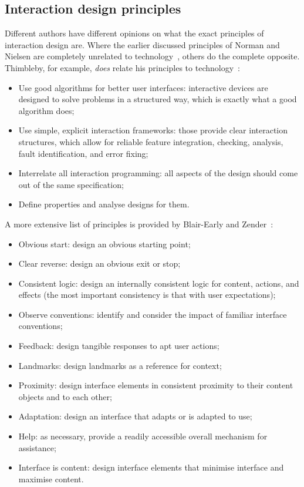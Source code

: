\subsection{Interaction design principles}
Different authors have different opinions on what the exact principles of interaction design are. Where the earlier discussed principles of Norman and Nielsen are completely unrelated to technology~\cite{norman2010gestural}, others do the complete opposite. Thimbleby, for example, \emph{does} relate his principles to technology~\cite{thimbleby2007press}:
\begin{itemize}[noitemsep,topsep=0pt,parsep=0pt,partopsep=0pt]
\item Use good algorithms for better user interfaces: interactive devices are designed to solve problems in a structured way, which is exactly what a good algorithm does;
\item Use simple, explicit interaction frameworks: those provide clear interaction structures, which allow for reliable feature integration, checking, analysis, fault identification, and error fixing;
\item Interrelate all interaction programming: all aspects of the design should come out of the same specification;
\item Define properties and analyse designs for them.
\end{itemize}
A more extensive list of principles is provided by Blair-Early and Zender~\cite{blair2008user}:
\begin{itemize}[noitemsep,topsep=0pt,parsep=0pt,partopsep=0pt]
\item Obvious start: design an obvious starting point;
\item Clear reverse: design an obvious exit or stop;
\item Consistent logic: design an internally consistent logic for content, actions, and effects (the most important consistency is that with user expectations);
\item Observe conventions: identify and consider the impact of familiar interface conventions;
\item Feedback: design tangible responses to apt user actions;
\item Landmarks: design landmarks as a reference for context;
\item Proximity: design interface elements in consistent proximity to their content objects and to each other;
\item Adaptation: design an interface that adapts or is adapted to use;
\item Help: as necessary, provide a readily accessible overall mechanism for assistance;
\item Interface is content: design interface elements that minimise interface and maximise content.
\end{itemize}


